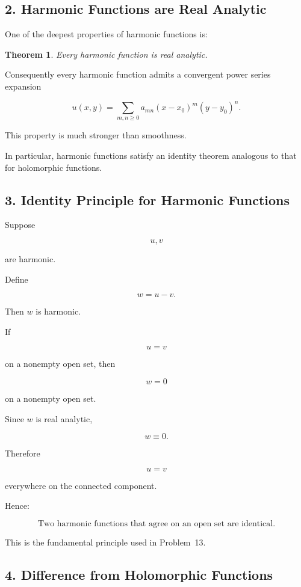 \documentclass[12pt,a4paper]{article}
\newtheorem{theorem}{Theorem}[section]
\theoremstyle{notespace}
\begin{document}
\bigskip

\subsection{2. Harmonic Functions are Real Analytic}

One of the deepest properties of harmonic functions is:

\begin{theorem}
	Every harmonic function is real analytic.
\end{theorem}

Consequently every harmonic function admits a convergent power series expansion

\[
u(x,y)
=
\sum_{m,n\ge0}
a_{mn}
(x-x_0)^m
(y-y_0)^n.
\]

This property is much stronger than smoothness.

In particular, harmonic functions satisfy an identity theorem analogous to that for holomorphic functions.

\bigskip

\subsection{3. Identity Principle for Harmonic Functions}

Suppose

\[
u,v
\]

are harmonic.

Define

\[
w=u-v.
\]

Then \(w\) is harmonic.

If

\[
u=v
\]

on a nonempty open set, then

\[
w=0
\]

on a nonempty open set.

Since \(w\) is real analytic,

\[
w\equiv0.
\]

Therefore

\[
u=v
\]

everywhere on the connected component.

Hence:

\[
\boxed{
	\text{Two harmonic functions that agree on an open set are identical.}
}
\]

This is the fundamental principle used in Problem~13.

\bigskip

\subsection{4. Difference from Holomorphic Functions}
\end{document}
